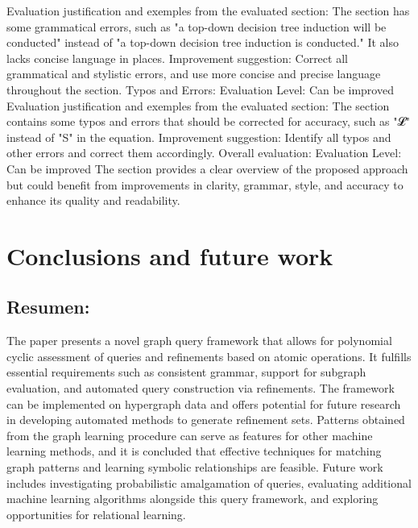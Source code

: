 \documentclass{article}%
\begin{document}
Evaluation justification and exemples from the evaluated section: The section has some grammatical errors, such as "a top{-}down decision tree induction will be conducted" instead of "a top{-}down decision tree induction is conducted." It also lacks concise language in places.\newline%
Improvement suggestion: Correct all grammatical and stylistic errors, and use more concise and precise language throughout the section.\newline%
\newline%
Typos and Errors:\newline%
Evaluation Level: Can be improved\newline%
Evaluation justification and exemples from the evaluated section: The section contains some typos and errors that should be corrected for accuracy, such as "𝓛" instead of "S" in the equation.\newline%
Improvement suggestion: Identify all typos and other errors and correct them accordingly.\newline%
\newline%
Overall evaluation:\newline%
Evaluation Level: Can be improved\newline%
The section provides a clear overview of the proposed approach but could benefit from improvements in clarity, grammar, style, and accuracy to enhance its quality and readability.

%
\clearpage%
\section{Conclusions and future work}%
\label{sec:Conclusionsandfuturework}%
\subsection{Resumen:}%
\label{subsec:Resumen}%
 The paper presents a novel graph query framework that allows for polynomial cyclic assessment of queries and refinements based on atomic operations. It fulfills essential requirements such as consistent grammar, support for subgraph evaluation, and automated query construction via refinements. The framework can be implemented on hypergraph data and offers potential for future research in developing automated methods to generate refinement sets. Patterns obtained from the graph learning procedure can serve as features for other machine learning methods, and it is concluded that effective techniques for matching graph patterns and learning symbolic relationships are feasible. Future work includes investigating probabilistic amalgamation of queries, evaluating additional machine learning algorithms alongside this query framework, and exploring opportunities for relational learning.
\end{document}

